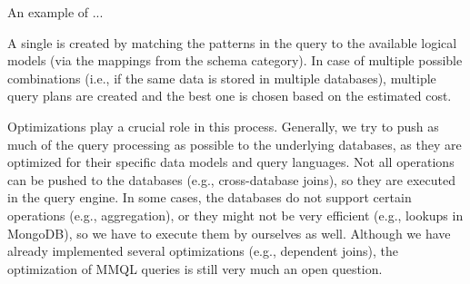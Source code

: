 An example of ...


A single  is created by matching the patterns in the query to the available logical models (via the mappings from the schema category). In case of multiple possible combinations (i.e., if the same data is stored in multiple databases), multiple query plans are created and the best one is chosen based on the estimated cost.

Optimizations play a crucial role in this process. Generally, we try to push as much of the query processing as possible to the underlying databases, as they are optimized for their specific data models and query languages. Not all operations can be pushed to the databases (e.g., cross-database joins), so they are executed in the query engine. In some cases, the databases do not support certain operations (e.g., aggregation), or they might not be very efficient (e.g., lookups in MongoDB), so we have to execute them by ourselves as well. Although we have already implemented several optimizations (e.g., dependent joins), the optimization of MMQL queries is still very much an open question.
